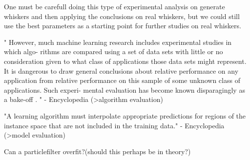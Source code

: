 
One must be carefull doing this type of experimental analysis on generate whiskers and then
applying the conclusions on real whiskers, but we could still use the best parameters
as a starting point for further studies on real whiskers.

"
However, much machine learning
research includes experimental studies in which algo-
rithms are compared using a set of data sets with little
or no consideration given to what class of applications
those data sets might represent. It is dangerous to draw
general conclusions about relative performance on any
application from relative performance on this sample
of some unknown class of applications. Such experi-
mental evaluation has become known disparagingly as
a bake-off .
" - Encyclopedia (>algorithm evaluation)

"A learning algorithm must interpolate appropriate predictions for regions of
the instance space that are not included in the training data." - Encyclopedia
(>model evaluation)


Can a particlefilter overfit?(should this perhaps be in theory?)
